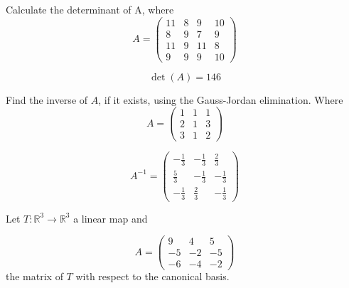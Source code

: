 \begin{questions}

\question Calculate the determinant of A, where
$$
A=\left(\begin{array}{rrrr}
11 & 8 & 9 & 10 \\
8 & 9 & 7 & 9 \\
11 & 9 & 11 & 8 \\
9 & 9 & 9 & 10
\end{array}\right)
$$

\begin{solution}
$$\det(A)=146$$
\end{solution}

\question Find the inverse of $A$, if it exists, using the Gauss-Jordan elimination. Where
$$
A=\left(\begin{array}{rrr}
1 & 1 & 1 \\
2 & 1 & 3 \\
3 & 1 & 2
\end{array}\right)
$$

\begin{solution}
$$A^{-1}=\left(\begin{array}{rrr}
-\frac{1}{3} & -\frac{1}{3} & \frac{2}{3} \\
\frac{5}{3} & -\frac{1}{3} & -\frac{1}{3} \\
-\frac{1}{3} & \frac{2}{3} & -\frac{1}{3}
\end{array}\right)$$
\end{solution}

\question Let $T:\mathbb{R}^3\rightarrow\mathbb{R}^3$  a linear map and
 
$$
A=\left(\begin{array}{rrr}
9 & 4 & 5 \\
-5 & -2 & -5 \\
-6 & -4 & -2
\end{array}\right)
$$
the matrix of $T$ with respect to the canonical basis.
\end{questions}
